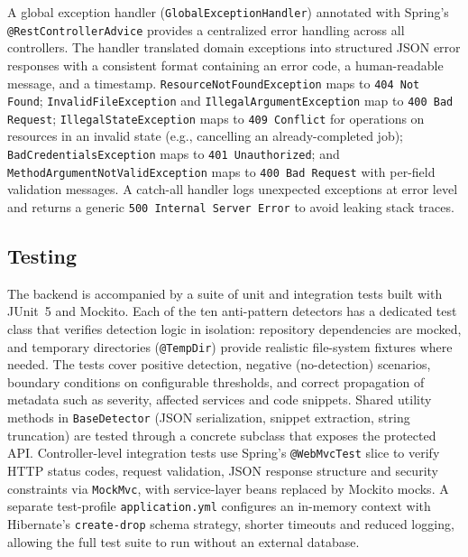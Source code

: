 \par A global exception handler (\texttt{GlobalExceptionHandler}) annotated with Spring's \texttt{@RestControllerAdvice} provides a centralized error handling across all controllers. The handler translated domain exceptions into structured JSON error responses with a consistent format containing an error code, a human-readable message, and a timestamp. \texttt{ResourceNotFoundException} maps to \texttt{404 Not Found}; \texttt{InvalidFileException} and \texttt{IllegalArgumentException} map to \texttt{400 Bad Request}; \texttt{IllegalStateException} maps to \texttt{409 Conflict} for operations on resources in an invalid state (e.g., cancelling an already-completed job); \texttt{Bad\-Cre\-den\-tialsEx\-cep\-tion} maps to \texttt{401 Unauthorized}; and \texttt{Me\-thodAr\-gu\-mentNotVa\-lidEx\-ception} maps to \texttt{400 Bad Request} with per-field validation messages. A catch-all handler logs unexpected exceptions at error level and returns a generic \texttt{500 Internal Server Error} to avoid leaking stack traces.

\subsection{Testing}
\label{subsec:testing}

\par The backend is accompanied by a suite of unit and integration tests built with JUnit~5 and Mockito. Each of the ten anti-pattern detectors has a dedicated test class that verifies detection logic in isolation: repository dependencies are mocked, and temporary directories (\texttt{@TempDir}) provide realistic file-system fixtures where needed. The tests cover positive detection, negative (no-detection) scenarios, boundary conditions on configurable thresholds, and correct propagation of metadata such as severity, affected services and code snippets. Shared utility methods in \texttt{BaseDetector} (JSON serialization, snippet extraction, string truncation) are tested through a concrete subclass that exposes the protected API. Controller-level integration tests use Spring's \texttt{@WebMvcTest} slice to verify HTTP status codes, request validation, JSON response structure and security constraints via \texttt{MockMvc}, with service-layer beans replaced by Mockito mocks. A separate test-profile \texttt{application.yml} configures an in-memory context with Hibernate's \texttt{create-drop} schema strategy, shorter timeouts and reduced logging, allowing the full test suite to run without an external database.


